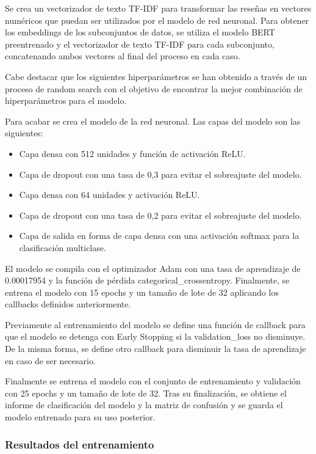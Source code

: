 Se crea un vectorizador de texto TF-IDF para transformar las reseñas en vectores numéricos que puedan ser utilizados por el modelo de red neuronal.
Para obtener los embeddings de los subconjuntos de datos, se utiliza el modelo BERT preentrenado y el vectorizador de texto TF-IDF para cada subconjunto, concatenando ambos vectores al final del proceso en cada caso.

Cabe destacar que los siguientes hiperparámetros se han obtenido a través de un proceso de random search con el objetivo de encontrar la mejor combinación de hiperparámetros para el modelo.

Para acabar se crea el modelo de la red neuronal. Las capas del modelo son las siguientes:
\begin{itemize}
    \item Capa densa con 512 unidades y función de activación ReLU.
    \item Capa de dropout con una tasa de 0,3 para evitar el sobreajuste del modelo.
    \item Capa densa con 64 unidades y activación ReLU.
    \item Capa de dropout con una tasa de 0,2 para evitar el sobreajuste del modelo.
    \item Capa de salida en forma de capa densa con una activación softmax para la clasificación multiclase.
\end{itemize}

El modelo se compila con el optimizador Adam con una tasa de aprendizaje de 0.00017954 y la función de pérdida categorical\_crossentropy.
Finalmente, se entrena el modelo con 15 epochs y un tamaño de lote de 32 aplicando los callbacks definidos anteriormente.

Previamente al entrenamiento del modelo se define una función de callback para que el modelo se detenga con Early Stopping si la validation\_loss no disminuye. 
De la misma forma, se define otro callback para disminuir la tasa de aprendizaje en caso de ser necesario.

Finalmente se entrena el modelo con el conjunto de entrenamiento y validación con 25 epochs y un tamaño de lote de 32.
Tras su finalización, se obtiene el informe de clasificación del modelo y la matriz de confusión y se guarda el modelo entrenado para su uso posterior.

\subsubsection{Resultados del entrenamiento}

